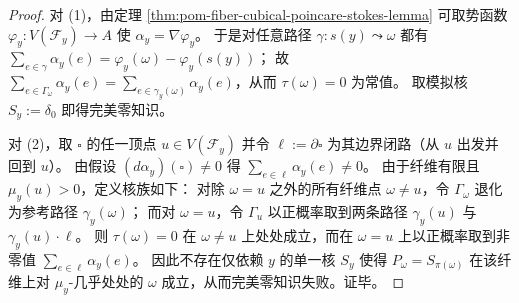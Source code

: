 \begin{proof}
对 (1)，由定理 \ref{thm:pom-fiber-cubical-poincare-stokes-lemma} 可取势函数 \(\varphi_y:V(\mathcal F_y)\to A\) 使 \(\alpha_y=\nabla\varphi_y\)。
于是对任意路径 \(\gamma:s(y)\leadsto \omega\) 都有
\(
\sum_{e\in\gamma}\alpha_y(e)=\varphi_y(\omega)-\varphi_y(s(y))
\)；
故 \(\sum_{e\in\Gamma_\omega}\alpha_y(e)=\sum_{e\in\gamma_y(\omega)}\alpha_y(e)\)，从而 \(\tau(\omega)=0\) 为常值。
取模拟核 \(S_y:=\delta_{0}\) 即得完美零知识。
\par
对 (2)，取 \(\square\) 的任一顶点 \(u\in V(\mathcal F_y)\) 并令 \(\ell:=\partial\square\) 为其边界闭路（从 \(u\) 出发并回到 \(u\)）。
由假设 \((d\alpha_y)(\square)\neq 0\) 得
\(
\sum_{e\in\ell}\alpha_y(e)\neq 0
\)。
由于纤维有限且 \(\mu_y(u)>0\)，定义核族如下：
对除 \(\omega=u\) 之外的所有纤维点 \(\omega\neq u\)，令 \(\Gamma_\omega\) 退化为参考路径 \(\gamma_y(\omega)\)；
而对 \(\omega=u\)，令 \(\Gamma_u\) 以正概率取到两条路径
\(
\gamma_y(u)
\)
与
\(
\gamma_y(u)\cdot \ell
\)。
则
\(
\tau(\omega)=0
\)
在 \(\omega\neq u\) 上处处成立，而在 \(\omega=u\) 上以正概率取到非零值 \(\sum_{e\in\ell}\alpha_y(e)\)。
因此不存在仅依赖 \(y\) 的单一核 \(S_y\) 使得 \(P_\omega=S_{\pi(\omega)}\) 在该纤维上对 \(\mu_y\)-几乎处处的 \(\omega\) 成立，从而完美零知识失败。证毕。
\end{proof}

\endinput
